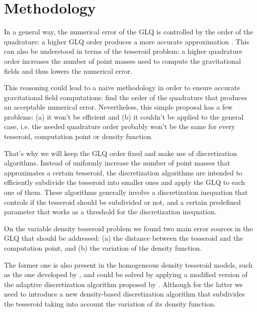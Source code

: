 \documentclass[extra]{gji}
\begin{document}

\section{Methodology}

In a general way, the numerical error of the GLQ is controlled by the 
order of the quadrature: a higher GLQ order produces a more accurate 
approximation \citep{Hildebrand1987}.
This can also be understood in terms of the tesseroid problem: a higher 
quadrature order increases the number of point masses used to compute 
the gravitational fields and thus lowers the numerical error.

This reasoning could lead to a naive methodology in order to ensure 
accurate gravitational field computations: find the order of the 
quadrature that produces an acceptable numerical error.
Nevertheless, this simple proposal has a few problems: (a) it won't be 
efficient \citep{Li2011, Uieda2016} and (b) it couldn't be applied to 
the general case, i.e. the needed quadrature order probably won't be 
the same for every tesseroid, computation point or density function.

That's why we will keep the GLQ order fixed and make use of 
discretization algorithms.
Instead of uniformly increase the number of point masses that 
approximates a certain tesseroid, the discretization algorithms are 
intended to efficiently subdivide the tesseroid into smaller ones and 
apply the GLQ to each one of them.
These algorithms generally involve a discretization inequation that 
controls if the tesseroid should be subdivided or not, and a certain 
predefined parameter that works as a threshold for the discretization 
inequation.

On the variable density tesseroid problem we found two main error 
sources in the GLQ that should be addressed: (a) the distance between 
the tesseroid and the computation point, and (b) 
the variation of the density function.

The former one is also present in the homogeneous density tesseroid 
models, such as the one developed by \citet{Uieda2016}, and could be 
solved by applying a modified version of the adaptive discretization 
algorithm proposed by \citet{Li2011}.
Although for the latter we need to introduce a new density-based 
discretization algorithm that subdivides the tesseroid taking into 
account the variation of its density function.
\end{document}
